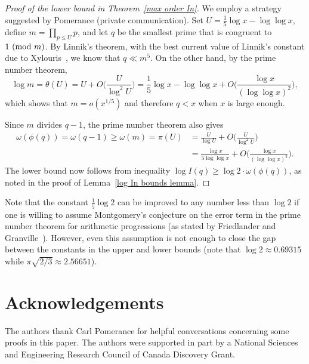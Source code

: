 \documentclass[12pt,reqno]{amsart}
\theoremstyle{definition}
\renewcommand{\mod}[1]{{\ifmmode\text{\rm\ (mod~$#1$)}\else\discretionary{}{}{\hbox{ }}\rm(mod~$#1$)\fi}}
\begin{document}
\begin{proof}[Proof of the lower bound in Theorem~\ref{max order In}]
We employ a strategy suggested by Pomerance (private communication). Set $U = \frac15\log x - \log\log x$, define $m = \prod_{p \le U} p$, and let $q$ be the smallest prime that is congruent to $1\mod m$. By Linnik's theorem, with the best current value of Linnik's constant due to Xylouris~\cite{tri11}, we know that $q \ll m^5$. On the other hand, by the prime number theorem,
\[
\log m = \theta(U) = U + O\bigg( \frac U{\log^2 U} \bigg) = \frac15\log x - \log\log x + O\bigg( \frac{\log x}{(\log\log x)^2} \bigg),
\]
which shows that $m=o(x^{1/5})$ and therefore $q<x$ when $x$ is large enough.

Since $m$ divides $q-1$, the prime number theorem also gives
\begin{align*}
\omega(\phi(q)) = \omega(q - 1) \ge \omega(m) = \pi(U) &= \frac U{\log U} + O\bigg( \frac U{\log^2 U} \bigg) \\
&= \frac{\log x}{5\log\log x} + O\bigg( \frac{\log x}{(\log\log x)^2} \bigg).
\end{align*}
The lower bound now follows from inequality $\log I(q) \geq \log 2 \cdot \omega(\phi(q))$, as noted in the proof of Lemma~\ref{log In bounds lemma}.
\end{proof}

Note that the constant $\frac15\log 2$ can be improved to any number less than $\log 2$ if one is willing to assume Montgomery's conjecture on the error term in the prime number theorem for arithmetic progressions (as stated by Friedlander and Granville~\cite[conjecture 1(b)]{FG}). However, even this assumption is not enough to close the gap between the constants in the upper and lower bounds (note that $\log2 \approx 0.69315$ while $\pi\sqrt{2/3} \approx 2.56651$).


\section*{Acknowledgements}

The authors thank Carl Pomerance for helpful conversations concerning some proofs in this paper.
The authors were supported in part by a National Sciences and Engineering Research Council of Canada Discovery Grant.



\end{document}
